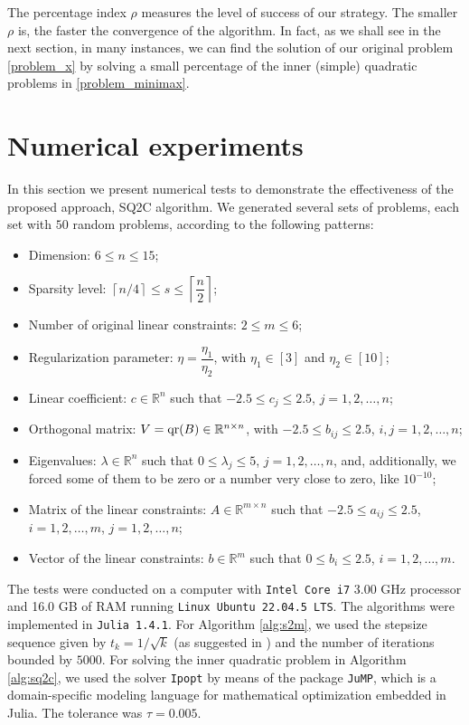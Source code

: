 \documentclass[smallextended,referee,envcountsect]{svjour3}
\newcommand{\R}{\mathbb{R}}
\begin{document}
The percentage index $\rho$ measures the level of success of our strategy. The 
smaller $\rho$ is, the faster the convergence of the algorithm. In fact, as we shall 
see in the next section, in many instances, we can find the solution of our original 
problem \eqref{problem_x} by solving a small percentage of the inner (simple) 
quadratic problems in \eqref{problem_minimax}. 


\section{Numerical experiments}
\label{sec:numerical_experiments}
In this section we present numerical tests to demonstrate the effectiveness of the 
proposed approach, SQ2C algorithm. We generated several sets of problems, each set with 
$50$ random problems, according to the following patterns: 
\begin{itemize}
\item Dimension: $6 \leq n \leq 15$;
\item Sparsity level: 
$\left\lceil{n}/{4}\right\rceil \leq s \leq \left\lceil\dfrac{n}{2}\right\rceil$; 
\item Number of original linear constraints: $2 \leq m \leq 6$;
\item Regularization parameter: $\eta = \dfrac{\eta_1}{\eta_2}$, with $\eta_1\in[3]$ and 
$\eta_2\in[10]$;
\item Linear coefficient: $c\in\R^n$ such that $-2.5 \leq c_j \leq 2.5$, 
$j = 1, 2, \ldots, n$;
\item Orthogonal matrix: $V = {\rm qr}(B)\in\R^{n\times n}$, with 
$-2.5 \leq b_{ij} \leq 2.5$, $i,j = 1, 2, \ldots, n$;
\item Eigenvalues: $\lambda\in\R^n$ such that $0 \leq \lambda_j \leq 5$, 
$j = 1, 2, \ldots, n$, and, additionally, we forced some of them to be zero or a number 
very close to zero, like $10^{-10}$;
\item Matrix of the linear constraints: $A\in\R^{m\times n}$ such that 
$-2.5 \leq a_{ij} \leq 2.5$, $i = 1, 2, \ldots, m$, $j = 1, 2, \ldots, n$;
\item Vector of the linear constraints: $b\in\R^m$ such that 
$0 \leq b_i \leq 2.5$, $i = 1, 2, \ldots, m$.
\end{itemize}

The tests were conducted on a computer with \texttt{Intel Core i7} 3.00 GHz 
processor and 16.0 GB of RAM running \texttt{Linux Ubuntu 22.04.5 LTS}. The algorithms 
were implemented in \texttt{Julia 1.4.1}. For Algorithm \ref{alg:s2m}, we used the 
stepsize sequence given by $t_k = {1}/{\sqrt{k}}$ (as suggested in \cite{Nesterov04}) 
and the number of iterations bounded by $5000$. For solving the inner quadratic problem in 
Algorithm \ref{alg:sq2c}, we used the solver \texttt{Ipopt} \cite{WachterBiegler06} by 
means of the package \texttt{JuMP}, which is a domain-specific modeling language for 
mathematical optimization embedded in Julia. The tolerance was $\tau = 0.005$. 
\end{document}
